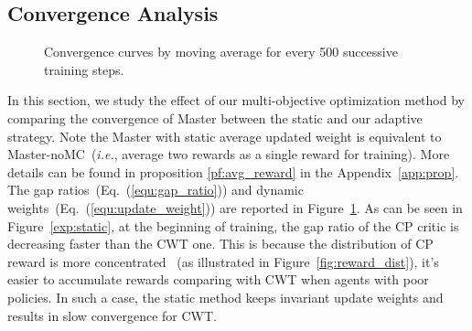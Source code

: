 \documentclass[sigconf]{acmart}
\newcommand{\stddpg}{{\sc Master}\xspace}
\newcommand{\ie}{\emph{i.e.},\xspace}
\newcommand\figref[1]{Figure~\ref{#1}}
\newcommand\appref[1]{Appendix~\ref{#1}}
\newcommand\equref[1]{Eq.~(\ref{#1})}
\begin{document}
\subsection{Convergence Analysis}
\begin{figure}[t]
\centering
{}
\caption{Convergence curves by moving average for every 500 successive training steps.}
 \vspace{-3mm}
\label{exp:convergence}
\end{figure} 
In this section, we study the effect of our multi-objective optimization method by comparing the convergence of \stddpg between the static and our adaptive strategy. Note the \stddpg with static average updated weight is equivalent to \stddpg-noMC~(\ie average two rewards as a single reward for training). More details can be found in proposition \ref{pf:avg_reward} in the \appref{app:prop}. 
The gap ratios~(\equref{equ:gap_ratio}) and dynamic weights~(\equref{equ:update_weight}) are reported in \figref{exp:convergence}. As can be seen in \figref{exp:static}, at the beginning of training, the gap ratio of the CP critic is decreasing faster than the CWT one. This is because the distribution of CP reward is more concentrated ~(as illustrated in \figref{fig:reward_dist}), it's easier to accumulate rewards comparing with CWT when agents with poor policies.
In such a case, the static method keeps invariant update weights and results in slow convergence for CWT. 
\end{document}
